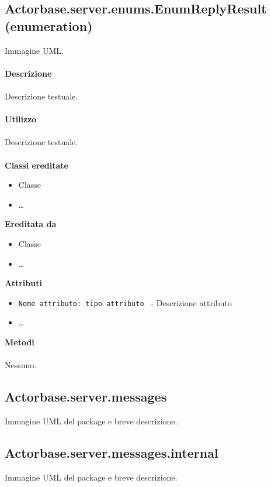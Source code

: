 \documentclass[a4paper]{article}
\begin{document}
	\subsection{Actorbase.server.enums.EnumReplyResult (enumeration)}
		Immagine UML.
		\\ \\
		\textbf{Descrizione}
			\\ \\
			Descrizione testuale.
			\\ \\
		\textbf{Utilizzo}
			\\ \\
			Descrizione testuale.
			\\ \\
		\textbf{Classi ereditate}
			\begin{itemize}
				\item Classe
				\item \dots
			\end{itemize}
		\textbf{Ereditata da}
			\begin{itemize}
				\item Classe
				\item \dots
			\end{itemize}
		\textbf{Attributi}
			\begin{itemize}
				\item \texttt{Nome attributo: tipo attributo } - Descrizione attributo
				\item \dots
			\end{itemize}
		\textbf{Metodi}
			\\ \\
			Nessuno.
			
	\subsection{Actorbase.server.messages}
		Immagine UML del package e breve descrizione.
		
	\subsection{Actorbase.server.messages.internal}
		Immagine UML del package e breve descrizione.
		
\end{document}
